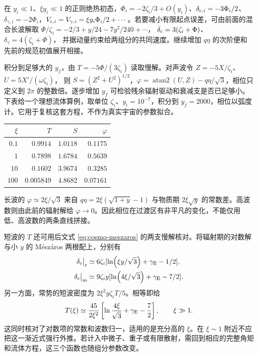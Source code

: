 在 $y_i\ll1$、$\xi y_i\ll1$ 的正则绝热初态，$\Phi_i=-2\zeta_i/3+O(y_i)$、$\delta_{{\rm c},i}=-3\Phi_i/2$、$\delta_{\gamma,i}=-2\Phi_i$，$V_{{\rm c},i}=V_{\gamma,i}=\xi y_i\Phi_i/2+\cdots$。若要减小有限起点误差，可由前面的混合长波解取
$\Phi/\zeta_i=-2/3+y/24-7y^2/240+\cdots$，
$\delta_{\rm c}=3(\zeta_i+\Phi)$、$\delta_\gamma=4(\zeta_i+\Phi)$，
并据动量约束给两组分的共同速度。继续增加 $q\eta$ 的次阶便和先前的规范初值展开相接。

积分到足够大的 $y_f$，由 $T=-5\Phi/(3\zeta_i)$ 读取慢解。对声波令
$Z=-5X/\zeta_i$、$U=5X'/(\omega\zeta_i)$，
则 $S=(Z^2+U^2)^{1/2}$，$\varphi=\operatorname{atan2}(U,Z)-q\eta/\sqrt3$，相位只定义到 $2\pi$ 的整数倍。逐步增加 $y_f$ 可检验残余辐射驱动和衰减支是否已足够小。下表给一个理想流体算例，取单位 $\zeta_i$、$y_i=10^{-7}$，积分到 $y_f=2000$，相位以弧度计。它用于复核这套方程，不作为真实宇宙的参数拟合。
\begin{center}
\begin{tabular}{@{}rrrr@{}}\toprule
$\xi$ & $T$ & $S$ & $\varphi$\\ \midrule
$0.1$ & $0.9914$ & $1.0118$ & $0.1175$\\
$1$   & $0.7898$ & $1.6784$ & $0.5639$\\
$10$  & $0.1602$ & $3.9674$ & $0.3285$\\
$100$ & $0.005849$ & $4.8682$ & $0.07161$\\ \bottomrule
\end{tabular}
\end{center}
长波的 $\varphi\simeq2\xi/\sqrt3$ 来自 $q\eta=2\xi(\sqrt{1+y}-1)$ 与物质期 $2\xi\sqrt y$ 的常数差。高波数则由此前的辐射解给 $\varphi\to0$。因此相位在过渡区有非平凡的变化，不能仅用低、高波数的两条直线拼接。

短波的 $T$ 还可用后文式 \eqref{eq:cosmo-meszaros} 的两支慢解核对。将辐射期的对数解与小 $y$ 的 Mészáros 两根配上，分别有
\[
 \begin{aligned}
 \delta_{\rm c}\big|_{\rm r}&\simeq
    6\zeta_i[\ln(\xi y/\sqrt3)+\gamma_{\rm E}-1/2],\\
 \delta_{\rm c}\big|_{\rm m}&\simeq
    9\zeta_i y[\ln(4\xi/\sqrt3)+\gamma_{\rm E}-7/2].
 \end{aligned}
\]
另一方面，常势的短波密度为 $2\xi^2y\zeta_i T/5$。相等即给
\[
 T(\xi)\simeq\frac{45}{2\xi^2}
             \left[\ln\frac{4\xi}{\sqrt3}+\gamma_{\rm E}-\frac72\right],
       \qquad \xi\gg1 .
\]
这同时核对了对数项的常数和波数归一，适用的是充分高的 $\xi$。在 $\xi\sim1$ 附近不应把这一渐近式强行外推。若计入中微子、重子或有限散射，需回到相应的完整角矩和流体方程，这三个函数也随组分参数改变。

